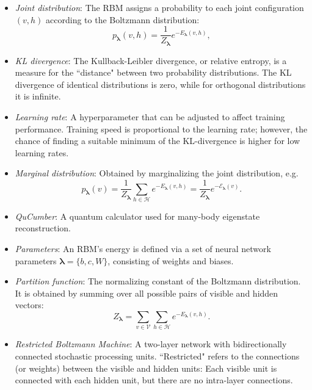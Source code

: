 \documentclass[submission, Phys, hidelnks]{SciPost}
\begin{document}
\begin{itemize}
\item {\it Joint distribution}: The RBM assigns a probability to each joint configuration $(v,h)$ according to the Boltzmann distribution:
\begin{equation}
   p_{\bm{\lambda}}(v,h) = \frac{1}{Z_{\bm{\lambda}}} e^{-E_{\bm{\lambda}}(v,h)},
\end{equation}

\item{\it KL divergence}: The Kullback-Leibler divergence, or relative entropy, is a measure for the ``distance" between two probability distributions. The KL divergence of identical distributions is zero, while for orthogonal distributions it is infinite.

\item{\it Learning rate}: A hyperparameter that can be adjusted to affect training performance. Training speed is proportional to the learning rate; however, the chance of finding a suitable minimum of the KL-divergence is higher for low learning rates.

\item {\it Marginal distribution}: Obtained by marginalizing the joint distribution, e.g.
\begin{equation}\label{Eq:marginal_distribution}
   p_{\bm{\lambda}}(v) = \frac{1}{Z_{\bm{\lambda}}} \sum\limits_{h\in \mathcal{H}} e^{-E_{\bm{\lambda}}(v,h)} = \frac{1}{Z_{\bm{\lambda}}} e^{- \mathcal{E}_{\bm{\lambda}}(v)}.
\end{equation}

\item {\it QuCumber}: A quantum calculator used for many-body eigenstate reconstruction.

\item {\it Parameters}: An RBM's energy is defined via a set of neural network parameters $\bm{\lambda} = \{b,c,W\}$, consisting of weights and biases.

\item {\it Partition function}: The normalizing constant of the Boltzmann distribution. It is obtained by summing over all possible pairs of visible and hidden vectors:
\begin{equation}
   Z_{\bm{\lambda}} = \sum\limits_{v\in \mathcal{V}}\sum\limits_{h\in \mathcal{H}} e^{-E_{\bm{\lambda}}(v,h)}.
\end{equation}

\item {\it Restricted Boltzmann Machine}: A two-layer network with bidirectionally connected stochastic processing units. ``Restricted" refers to the connections (or weights) between the visible and hidden units: Each visible unit is connected with each hidden unit, but there are no intra-layer connections.


\end{itemize}
\end{document}
